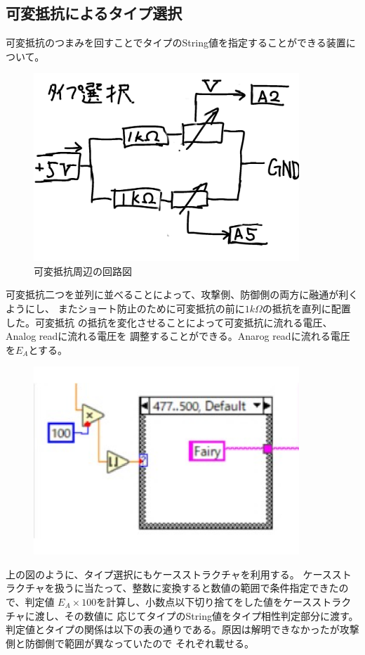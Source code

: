 \documentclass[a4paper,titlepage,11pt]{ltjsarticle}
\begin{document}
\subsection{可変抵抗によるタイプ選択}
可変抵抗のつまみを回すことでタイプのString値を指定することができる装置について。
\begin{figure}[H]
  \begin{center}
    \includegraphics[width=100mm]{typechose.pdf}
    \caption{可変抵抗周辺の回路図}
  \end{center}
\end{figure}
可変抵抗二つを並列に並べることによって、攻撃側、防御側の両方に融通が利くようにし、
またショート防止のために可変抵抗の前に$1k\Omega $の抵抗を直列に配置した。可変抵抗
の抵抗を変化させることによって可変抵抗に流れる電圧、Analog readに流れる電圧を
調整することができる。Anarog readに流れる電圧を$E_{A}$とする。
\begin{figure}[H]
  \begin{center}
    \includegraphics[width=100mm]{typechose_s.pdf}
    \caption{}
  \end{center}
\end{figure}
上の図のように、タイプ選択にもケースストラクチャを利用する。
ケースストラクチャを扱うに当たって、整数に変換すると数値の範囲で条件指定できたので、判定値
$E_{A}\times 100$を計算し、小数点以下切り捨てをした値をケースストラクチャに渡し、その数値に
応じてタイプのString値をタイプ相性判定部分に渡す。
判定値とタイプの関係は以下の表の通りである。原因は解明できなかったが攻撃側と防御側で範囲が異なっていたので
それぞれ載せる。
\end{document}
